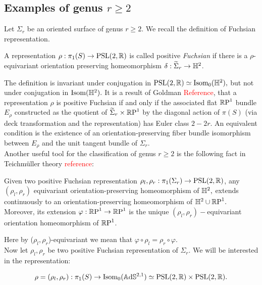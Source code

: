 
\subsection{Examples of genus $r\geq 2$}
Let $\Sigma_r$ be an oriented surface of genus $r\geq 2.$ We recall the definition of Fuchsian representation. 

\begin{definition}
    A representation $\rho:\pi_1(S)\to \text{PSL}(2,\mathbb{R})$ is called positive \textit{Fuchsian} if there is a $\rho$-equivariant orientation preserving homeomorphism $\delta:\widetilde{\Sigma}_r\to\mathbb{H}^2$.
\end{definition}

The definition is invariant under conjugation in $\text{PSL}(2,\mathbb{R})\simeq\text{Isom}_0(\mathbb{H}^2),$ but not under conjugation in $\text{Isom}(\mathbb{H}^2).$ It is a result of Goldman \textcolor{red}{Reference}, that a representation $\rho$ is positive Fuchsian if and only if the associated flat $\mathbb{R}\text{P}^1$ bundle $E_\rho$ constructed as the quotient of $\widetilde{\Sigma}_r\times\mathbb{R}\text{P}^1$ by the diagonal action of $\pi(S)$ (via deck transformation and the representation) has Euler class $2-2r.$ An equivalent condition is the existence of an orientation-preserving fiber bundle isomorphism between $E_\rho$ and the unit tangent bundle of $\Sigma_r.$ \\   

Another useful tool for the classification of genus $r\geq 2$ is the following fact in Teichm\"uller theory \textcolor{red}{reference}:

\begin{lemma}
    Given two positive Fuchsian representation $\rho_l,\rho_r:\pi_1(\Sigma_r)\to\text{PSL}(2,\mathbb{R})$, any $(\rho_l,\rho_r)$ equivariant orientation-preserving homeomorphism of $\mathbb{H}^2,$ extends continuously to an orientation-preserving homeomorphism of $\mathbb{H}^2\cup\mathbb{R}\text{P}^1.$ Moreover, its extension $\varphi:\mathbb{R}\text{P}^1\to\mathbb{R}\text{P}^1$ is the unique $(\rho_l,\rho_r)-$equivariant orientation homeomorphism of $\mathbb{R}\text{P}^1$.     
\end{lemma}

Here by ($\rho_l,\rho_r$)-equivariant we mean that $\varphi\circ\rho_l=\rho_r\circ\varphi.$\\
Now let $\rho_l,\rho_r$ be two positive Fuchsian representation of $\Sigma_r.$ We will be interested in the representation:

\[
    \rho=(\rho_l,\rho_r):\pi_1(S)\to\text{Isom}_0(\mathbb{A}\mathrm{d}\mathbb{S}^{2,1})\simeq \text{PSL}(2,\mathbb{R})\times\text{PSL}(2,\mathbb{R}).
\]

